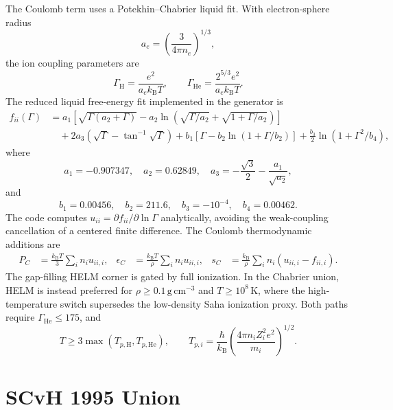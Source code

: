\documentclass[11pt]{article}
\newcommand{\kb}{k_{\mathrm B}}
\newcommand{\eps}{\epsilon}
\begin{document}
The Coulomb term uses a Potekhin--Chabrier liquid fit.
With electron-sphere radius
\begin{equation}
  a_e=\left(\frac{3}{4\pi n_e}\right)^{1/3},
\end{equation}
the ion coupling parameters are
\begin{equation}
  \Gamma_{\mathrm H}=\frac{e^2}{a_e\kb T},\qquad
  \Gamma_{\mathrm{He}}=\frac{2^{5/3}e^2}{a_e\kb T}.
\end{equation}
The reduced liquid free-energy fit implemented in the generator is
\begin{align}
  f_{ii}(\Gamma) &=
  a_1\left[
  \sqrt{\Gamma(a_2+\Gamma)}
  -a_2\ln\left(\sqrt{\Gamma/a_2}+\sqrt{1+\Gamma/a_2}\right)
  \right]
\\
  &\quad
  +2a_3\left(\sqrt{\Gamma}-\tan^{-1}\sqrt{\Gamma}\right)
  +b_1\left[\Gamma-b_2\ln(1+\Gamma/b_2)\right]
  +\frac{b_3}{2}\ln(1+\Gamma^2/b_4),
\end{align}
where
\begin{equation}
  a_1=-0.907347,\quad a_2=0.62849,\quad
  a_3=-\frac{\sqrt3}{2}-\frac{a_1}{\sqrt{a_2}},
\end{equation}
and
\begin{equation}
  b_1=0.00456,\quad b_2=211.6,\quad
  b_3=-10^{-4},\quad b_4=0.00462.
\end{equation}
The code computes
$u_{ii}=\partial f_{ii}/\partial\ln\Gamma$ analytically, avoiding the
weak-coupling cancellation of a centered finite difference.
The Coulomb thermodynamic additions are
\begin{align}
  P_C &= \frac{\kb T}{3}\sum_i n_i u_{ii,i},
&
  \eps_C &= \frac{\kb T}{\rho}\sum_i n_i u_{ii,i},
&
  s_C &= \frac{\kb}{\rho}\sum_i n_i(u_{ii,i}-f_{ii,i}).
\end{align}
The gap-filling HELM corner is gated by full ionization.  In the Chabrier
union, HELM is instead preferred for $\rho\ge0.1\,\mathrm{g\,cm^{-3}}$ and
$T\ge10^8\,\mathrm K$, where the high-temperature switch supersedes the
low-density Saha ionization proxy.  Both paths require
$\Gamma_{\mathrm{He}}\le175$,
and
\begin{equation}
  T \ge 3\max(T_{p,\mathrm H},T_{p,\mathrm{He}}),
  \qquad
  T_{p,i}=\frac{\hbar}{\kb}
  \left(\frac{4\pi n_i Z_i^2e^2}{m_i}\right)^{1/2}.
\end{equation}

\section{SCvH 1995 Union}
\end{document}
